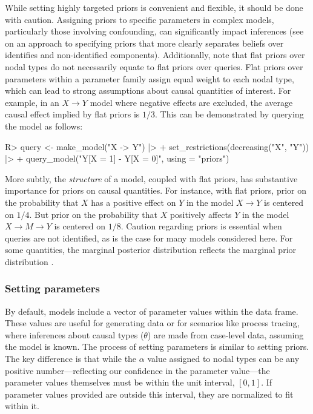 \documentclass[
  11pt,
  article]{jss}
\renewcommand{\texttt}[1]{\code{#1}}
\begin{document}
While setting highly targeted priors is convenient and flexible, it
should be done with caution. Assigning priors to specific parameters in
complex models, particularly those involving confounding, can
significantly impact inferences (see \citet{richardson2011transparent}
on an approach to specifying priors that more clearly separates beliefs
over identifies and non-identified components). Additionally, note that
flat priors over nodal types do not necessarily equate to flat priors
over queries. Flat priors over parameters within a parameter family
assign equal weight to each nodal type, which can lead to strong
assumptions about causal quantities of interest. For example, in an
\(X \rightarrow Y\) model where negative effects are excluded, the
average causal effect implied by flat priors is \(1/3\). This can be
demonstrated by querying the model as follows:

\begin{CodeInput}
R> query <- make_model("X -> Y") |> 
+    set_restrictions(decreasing("X", "Y")) |>
+    query_model("Y[X = 1] - Y[X = 0]", using = "priors")
\end{CodeInput}

More subtly, the \emph{structure} of a model, coupled with flat priors,
has substantive importance for priors on causal quantities. For
instance, with flat priors, prior on the probability that \(X\) has a
positive effect on \(Y\) in the model \(X \rightarrow Y\) is centered on
\(1/4\). But prior on the probability that \(X\) positively affects
\(Y\) in the model \(X \rightarrow M \rightarrow Y\) is centered on
\(1/8\). Caution regarding priors is essential when queries are not
identified, as is the case for many models considered here. For some
quantities, the marginal posterior distribution reflects the marginal
prior distribution \citep{poirier_revising_1998}.

\subsubsection{Setting parameters}\label{parameters}

By default, models include a vector of parameter values within the
\texttt{parameters\_df} data frame. These values are useful for
generating data or for scenarios like process tracing, where inferences
about causal types (\(\theta\)) are made from case-level data, assuming
the model is known. The process of setting parameters is similar to
setting priors. The key difference is that while the \(\alpha\) value
assigned to nodal types can be any positive number---reflecting our
confidence in the parameter value---the parameter values themselves must
be within the unit interval, \([0,1]\). If parameter values provided are
outside this interval, they are normalized to fit within it.
\end{document}
